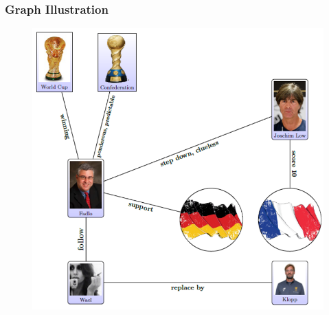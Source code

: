 \documentclass[xcolor=table]{beamer}
\begin{document}
\begin{frame}
\frametitle{Graph Illustration}
\begin{figure}[!htb]
   \centering
    \includegraphics[scale=0.4]{img0008.png}
    
\end{figure}

\end{frame}
\end{document}
